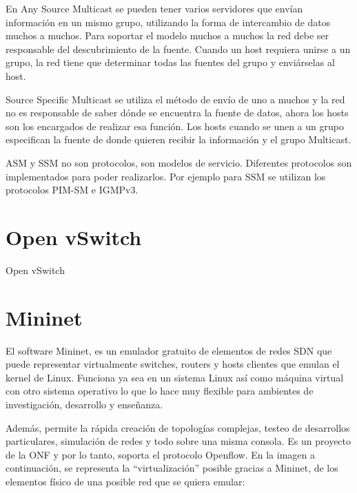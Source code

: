 \documentclass[12pt,a4paper,oneside]{book}
\begin{document}
En Any Source Multicast se pueden tener varios servidores que envían información en un mismo grupo, utilizando la forma de intercambio de datos muchos a muchos. Para soportar el modelo muchos a muchos la red debe ser responsable del descubrimiento de la fuente. Cuando un host requiera unirse a un grupo, la red tiene que determinar todas las fuentes del grupo y enviárselas al host.

\vspace{0.5cm}

Source Specific Multicast se utiliza el método de envío de uno a muchos y la red no es responsable de saber dónde se encuentra la fuente de datos, ahora los hosts son los encargados de realizar esa función. Los hosts cuando se unen a un grupo especifican la fuente de donde quieren recibir la información y el grupo Multicast.

\vspace{0.5cm}

ASM y SSM no son protocolos, son modelos de servicio. Diferentes protocolos son implementados para poder realizarlos. Por ejemplo para SSM se utilizan los protocolos PIM-SM e IGMPv3.


\section{Open vSwitch}
\label{marco_openvswitch}

Open vSwitch

\section{Mininet}
\label{marco_mininet}

El software Mininet, es un emulador gratuito de elementos de redes SDN que puede representar virtualmente switches, routers y hosts clientes que emulan el kernel de Linux. Funciona  ya sea en un sistema Linux así como máquina virtual con otro sistema operativo lo que lo hace muy flexible para ambientes de investigación, desarrollo y enseñanza.

\vspace{0.5cm}

Además, permite la rápida creación de topologías complejas, testeo de desarrollos particulares, simulación de redes y todo sobre una misma consola. Es un proyecto de la ONF y por lo tanto, soporta el protocolo Openflow. En la imagen a continuación, se representa la “virtualización” posible gracias a Mininet, de los elementos físico de una posible red que se quiera emular:
\end{document}
